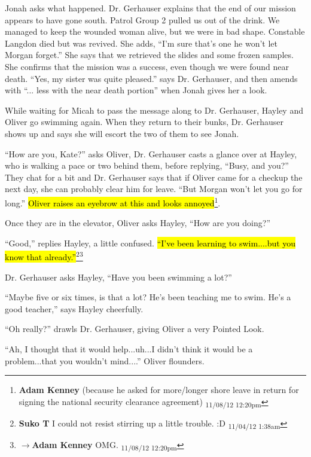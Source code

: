 Jonah asks what happened.  Dr. Gerhauser explains that the end of our mission appears to have gone south.  Patrol Group 2 pulled us out of the drink.  We managed to keep the wounded woman alive, but we were in bad shape.  Constable Langdon died but was revived.  She adds, ``I'm sure that's one he won't let Morgan forget.''  She says that we retrieved the slides and some frozen samples. She confirms that the mission was a success, even though we were found near death. ``Yes, my sister was quite pleased.''  says Dr. Gerhauser, and then amends with ``... less with the near death portion'' when Jonah gives her a look.



While waiting for Micah to pass the message along to Dr. Gerhauser, Hayley and Oliver go swimming again.  When they return to their bunks, Dr. Gerhauser shows up and says she will escort the two of them to see Jonah.



``How are you, Kate?'' asks Oliver,  Dr. Gerhauser casts a glance over at Hayley, who is walking a pace or two behind them, before replying, ``Busy, and you?''  They chat for a bit and Dr. Gerhauser says that if Oliver came for a checkup the next day, she can probably clear him for leave.  ``But Morgan won't let you go for long.''  \hl{Oliver raises an eyebrow at this and looks annoyed}\footnote{\textbf{Adam Kenney }(because he asked for more/longer shore leave in return for signing the national security clearance agreement) \textsubscript{11/08/12 12:20pm}}.



Once they are in the elevator, Oliver asks Hayley, ``How are you doing?''

``Good,'' replies Hayley, a little confused.  \hl{``I've been learning to swim....but you know that already.''}\footnote{\textbf{Suko T }I could not resist stirring up a little trouble. :D \textsubscript{11/04/12 1:38am}}\footnote{$\rightarrow$\textbf{Adam Kenney }OMG. \textsubscript{11/08/12 12:20pm}}

Dr. Gerhauser asks Hayley, ``Have you been swimming a lot?''

``Maybe five or six times, is that a lot?  He's been teaching me to swim.  He's a good teacher,'' says Hayley cheerfully.

``Oh really?'' drawls Dr. Gerhauser, giving Oliver a very Pointed Look.

``Ah, I thought that it would help...uh...I didn't think it would be a problem...that you wouldn't mind....'' Oliver flounders.

